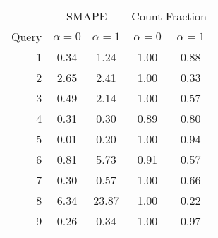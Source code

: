 \begin{tabular}{rcccc}
\toprule
      & \multicolumn{2}{c}{SMAPE}   & \multicolumn{2}{c}{Count Fraction} \\
Query & $\alpha = 0$ & $\alpha = 1$ & $\alpha = 0$ & $\alpha = 1$    \\
\midrule
    1 & 0.34         & 1.24         & 1.00         & 0.88            \\
    2 & 2.65         & 2.41         & 1.00         & 0.33            \\
    3 & 0.49         & 2.14         & 1.00         & 0.57            \\
    4 & 0.31         & 0.30         & 0.89         & 0.80            \\
    5 & 0.01         & 0.20         & 1.00         & 0.94            \\
    6 & 0.81         & 5.73         & 0.91         & 0.57            \\
    7 & 0.30         & 0.57         & 1.00         & 0.66            \\
    8 & 6.34         & 23.87        & 1.00         & 0.22            \\
    9 & 0.26         & 0.34         & 1.00         & 0.97            \\
\bottomrule
\end{tabular}
